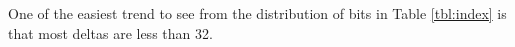 One of the easiest trend to see from the distribution of bits in Table \ref{tbl:index} is that most deltas are less than 32.%

